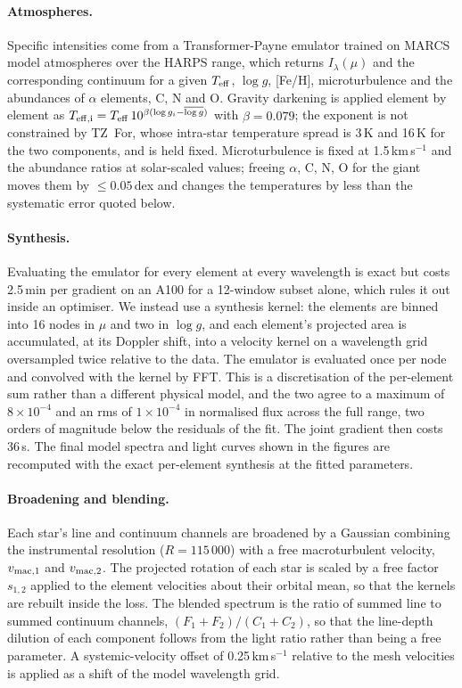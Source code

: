 \paragraph{Atmospheres.}
Specific intensities come from a Transformer-Payne emulator trained on MARCS
model atmospheres over the HARPS range, which returns $I_\lambda(\mu)$ and the
corresponding continuum for a given $T_{\rm eff}$, $\log g$, [Fe/H],
microturbulence and the abundances of $\alpha$ elements, C, N and O. Gravity
darkening is applied element by element as
$T_{\rm eff,i}=T_{\rm eff}\,10^{\beta(\log g_i-\overline{\log g})}$ with
$\beta=0.079$; the exponent is not constrained by TZ~For, whose intra-star
temperature spread is 3\,K and 16\,K for the two components, and is held fixed.
Microturbulence is fixed at 1.5\,km\,s$^{-1}$ and the abundance ratios at
solar-scaled values; freeing $\alpha$, C, N, O for the giant moves them by
$\le0.05$\,dex and changes the temperatures by less than the systematic error
quoted below.

\paragraph{Synthesis.}
Evaluating the emulator for every element at every wavelength is exact but costs
2.5\,min per gradient on an A100 for a 12-window subset alone, which rules it out
inside an optimiser. We instead use a synthesis kernel: the elements are binned
into 16 nodes in $\mu$ and two in $\log g$, and each element's projected area is
accumulated, at its Doppler shift, into a velocity kernel on a wavelength grid
oversampled twice relative to the data. The emulator is evaluated once per node
and convolved with the kernel by FFT. This is a discretisation of the
per-element sum rather than a different physical model, and the two agree to a
maximum of $8\times10^{-4}$ and an rms of $1\times10^{-4}$ in normalised flux
across the full range, two orders of magnitude below the residuals of the fit.
The joint gradient then costs 36\,s. The final model spectra and light curves
shown in the figures are recomputed with the exact per-element synthesis at the
fitted parameters.

\paragraph{Broadening and blending.}
Each star's line and continuum channels are broadened by a Gaussian combining the
instrumental resolution ($R=115\,000$) with a free macroturbulent velocity,
$v_{\rm mac,1}$ and $v_{\rm mac,2}$. The projected rotation of each star is
scaled by a free factor $s_{1,2}$ applied to the element velocities about their
orbital mean, so that the kernels are rebuilt inside the loss. The blended
spectrum is the ratio of summed line to summed continuum channels,
$(F_1+F_2)/(C_1+C_2)$, so that the line-depth dilution of each component follows
from the light ratio rather than being a free parameter. A systemic-velocity
offset of 0.25\,km\,s$^{-1}$ relative to the mesh velocities is applied as a
shift of the model wavelength grid.


